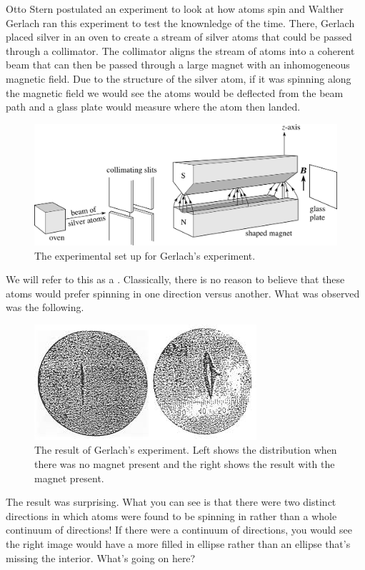 \documentclass{article}
\begin{document}
Otto Stern postulated an experiment to look at how atoms spin and Walther Gerlach ran this experiment to test the knownledge of the time.  There, Gerlach placed silver in an oven to create a stream of silver atoms that could be passed through a collimator. The collimator aligns the stream of atoms into a coherent beam that can then be passed through a large magnet with an inhomogeneous magnetic field.  Due to the structure of the silver atom, if it was spinning along the magnetic field we would see the atoms would be deflected from the beam path and a glass plate would measure where the atom then landed. 

\begin{figure}[H]
    \centering
    \includegraphics[width=.6\textwidth]{stern_gerlach.png}
    \caption{The experimental set up for Gerlach's experiment.}
\end{figure}

We will refer to this as a . Classically, there is no reason to believe that these atoms would prefer spinning in one direction versus another. What was observed was the following.

\begin{figure}[H]
    \centering
    \includegraphics[width=.6\textwidth]{result.jpg}
    \caption{The result of Gerlach's experiment. Left shows the distribution when there was no magnet present and the right shows the result with the magnet present.}
\end{figure}

The result was surprising. What you can see is that there were two distinct directions in which atoms were found to be spinning in rather than a whole continuum of directions! If there were a continuum of directions, you would see the right image would have a more filled in ellipse rather than an ellipse that's missing the interior. What's going on here?
\end{document}
